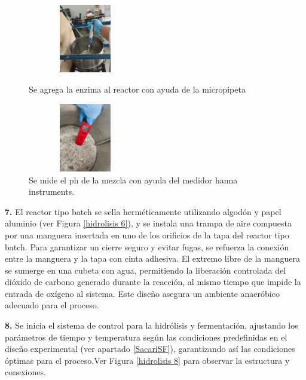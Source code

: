 \documentclass[12pt]{article}
\begin{document}
	     \begin{figure}[H]
	     	\centering
	     	\begin{minipage}{0.46\textwidth}
	     		\centering
	     		\includegraphics[width=5cm, height=3cm]{imagenes/hidrolisis9} %
	     		\caption{ Se agrega la enzima al reactor con ayuda de la micropipeta }
	     		\label{hidrolisis9}
	     	\end{minipage}
	     	\hfill
	     	\begin{minipage}{0.48\textwidth}
	     		\centering
	     		\includegraphics[width=5cm, height=3cm]{imagenes/hidrolisis3 } %
	     		\caption{ Se mide el ph de la mezcla con ayuda del medidor hanna instruments.}
	     		\label{hidrolisis3}
	     	\end{minipage}
	     \end{figure}
	     
	      \textbf{7.} El reactor tipo batch se sella herméticamente utilizando algodón y papel aluminio (ver Figura \ref{hidrolisis 6}), y se instala una trampa de aire compuesta por una manguera insertada en uno de los orificios de la tapa del reactor tipo batch. Para garantizar un cierre seguro y evitar fugas, se refuerza la conexión entre la manguera y la tapa con cinta adhesiva. El extremo libre de la manguera se sumerge en una cubeta con agua, permitiendo la liberación controlada del dióxido de carbono generado durante la reacción, al mismo tiempo que impide la entrada de oxígeno al sistema. Este diseño asegura un ambiente anaeróbico adecuado para el proceso.
	
	     
	     	\textbf{8.} Se inicia el sistema de control para la hidrólisis y fermentación, ajustando los parámetros de tiempo y temperatura según las condiciones predefinidas en el diseño experimental (ver apartado \ref{SacariSF}), garantizando así las condiciones óptimas para el proceso.Ver Figura \ref{hidrolisis 8} para observar la estructura y conexiones.
	     	
\end{document}
